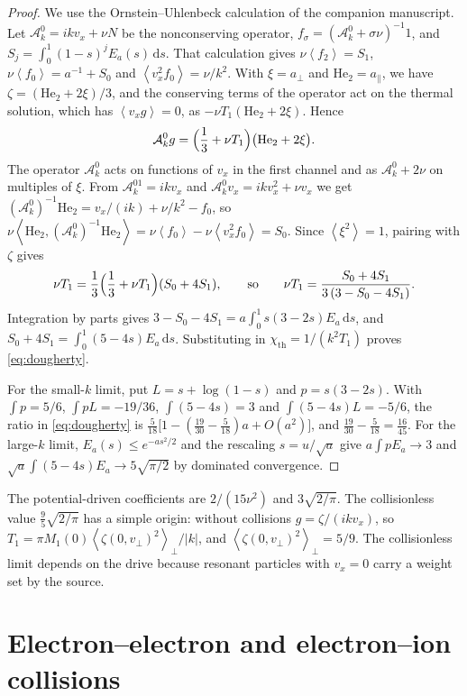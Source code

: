 \documentclass[11pt]{article}
\newcommand{\dd}{\,\mathrm d}
\newcommand{\av}[1]{\left\langle #1\right\rangle}
\newcommand{\A}{\mathcal A}
\newcommand{\thr}{\mathrm{th}}
\theoremstyle{definition}
\theoremstyle{remark}
\numberwithin{equation}{section}
\begin{document}
\begin{proof}
We use the Ornstein--Uhlenbeck calculation of the companion manuscript.
Let $\A_k^0=ikv_x+\nu N$ be the nonconserving operator,
$f_\sigma=(\A_k^0+\sigma\nu)^{-1}1$, and
$S_j=\int_0^1(1-s)^jE_a(s)\dd s$. That calculation gives
$\nu\av{f_2}=S_1$, $\nu\av{f_0}=a^{-1}+S_0$ and
$\av{v_x^2f_0}=\nu/k^2$. With $\xi=a_\perp$ and $\mathrm{He}_2=a_\parallel$,
we have $\zeta=(\mathrm{He}_2+2\xi)/3$, and the conserving terms of the
operator act on the thermal solution, which has $\av{v_xg}=0$, as
$-\nu T_1(\mathrm{He}_2+2\xi)$. Hence
\[
 \A_k^0g=\Bigl(\frac13+\nu T_1\Bigr)\bigl(\mathrm{He}_2+2\xi\bigr).
\]
The operator $\A_k^0$ acts on functions of $v_x$ in the first channel and
as $\A_k^0+2\nu$ on multiples of $\xi$. From $\A_k^01=ikv_x$ and
$\A_k^0v_x=ikv_x^2+\nu v_x$ we get
$(\A_k^0)^{-1}\mathrm{He}_2=v_x/(ik)+\nu/k^2-f_0$, so
$\nu\av{\mathrm{He}_2,(\A_k^0)^{-1}\mathrm{He}_2}
=\nu\av{f_0}-\nu\av{v_x^2f_0}=S_0$.
Since $\av{\xi^2}=1$, pairing with $\zeta$ gives
\[
 \nu T_1=\frac13\Bigl(\frac13+\nu T_1\Bigr)(S_0+4S_1),
 \qquad\text{so}\qquad
 \nu T_1=\frac{S_0+4S_1}{3\,(3-S_0-4S_1)} .
\]
Integration by parts gives
$3-S_0-4S_1=a\int_0^1s(3-2s)E_a\dd s$, and
$S_0+4S_1=\int_0^1(5-4s)E_a\dd s$. Substituting in
$\chi_\thr=1/(k^2T_1)$ proves \eqref{eq:dougherty}.

For the small-$k$ limit, put $L=s+\log(1-s)$ and $p=s(3-2s)$. With
$\int p=5/6$, $\int pL=-19/36$, $\int(5-4s)=3$ and
$\int(5-4s)L=-5/6$, the ratio in \eqref{eq:dougherty} is
$\tfrac5{18}\bigl[1-(\tfrac{19}{30}-\tfrac5{18})a+O(a^2)\bigr]$, and
$\tfrac{19}{30}-\tfrac5{18}=\tfrac{16}{45}$. For the large-$k$ limit,
$E_a(s)\leq e^{-as^2/2}$ and the rescaling $s=u/\sqrt a$ give
$a\int pE_a\to3$ and $\sqrt a\int(5-4s)E_a\to5\sqrt{\pi/2}$ by dominated
convergence.
\end{proof}

The potential-driven coefficients are $2/(15\nu^2)$ and
$3\sqrt{2/\pi}$. The collisionless value $\tfrac95\sqrt{2/\pi}$ has a
simple origin: without collisions $g=\zeta/(ikv_x)$, so
$T_1=\pi M_1(0)\av{\zeta(0,v_\perp)^2}_\perp/|k|$, and
$\av{\zeta(0,v_\perp)^2}_\perp=5/9$. The collisionless limit depends on
the drive because resonant particles with $v_x=0$ carry a weight set by
the source.

\section{Electron--electron and electron--ion collisions}\label{sec:electron}
\end{document}
